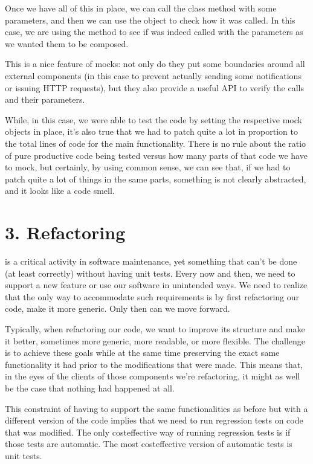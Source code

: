 \documentclass[a4paper,10pt,english]{sphinxmanual}
\begin{document}
Once we have all of this in place, we can call the class method with some parameters, and
then we can use the  object to check how it was called. In this case, we are using the
method to see if  was indeed called with the parameters as we wanted
them to be composed.

This is a nice feature of mocks: not only do they put some boundaries around all external
components (in this case to prevent actually sending some notifications or issuing HTTP
requests), but they also provide a useful API to verify the calls and their parameters.

While, in this case, we were able to test the code by setting the respective mock objects in
place, it’s also true that we had to patch quite a lot in proportion to the total lines of code for
the main functionality. There is no rule about the ratio of pure productive code being tested
versus how many parts of that code we have to mock, but certainly, by using common
sense, we can see that, if we had to patch quite a lot of things in the same parts, something
is not clearly abstracted, and it looks like a code smell.


\section{3. Refactoring}
\label{\detokenize{chapters/8_unit_testing/index:refactoring}}
 is a critical activity in software maintenance, yet something that can’t be done
(at least correctly) without having unit tests. Every now and then, we need to support a
new feature or use our software in unintended ways. We need to realize that the only way
to accommodate such requirements is by first refactoring our code, make it more generic.
Only then can we move forward.

Typically, when refactoring our code, we want to improve its structure and make it better,
sometimes more generic, more readable, or more flexible. The challenge is to achieve these
goals while at the same time preserving the exact same functionality it had prior to the
modifications that were made. This means that, in the eyes of the clients of those
components we’re refactoring, it might as well be the case that nothing had happened at all.

This constraint of having to support the same functionalities as before but with a different
version of the code implies that we need to run regression tests on code that was modified.
The only cost\sphinxhyphen{}effective way of running regression tests is if those tests are automatic. The
most cost\sphinxhyphen{}effective version of automatic tests is unit tests.
\end{document}
